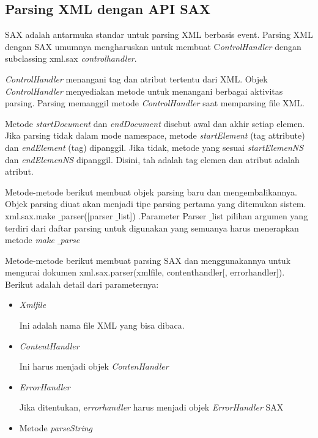 \vspace{10pt}
\subsection{Parsing XML dengan API SAX} 
 
\hspace*{0.5in} SAX adalah antarmuka standar untuk parsing XML berbasis event. Parsing XML dengan SAX umumnya mengharuskan untuk membuat C\textit{ontrolHandler }dengan subclassing xml.sax \textit{controlhandler}. 
 
\hspace*{0.5in} \textit{ControlHandler }menangani tag dan atribut tertentu dari XML. Objek \textit{ControlHandler }menyediakan metode untuk menangani berbagai aktivitas parsing. Parsing memanggil metode \textit{ControlHandler }saat memparsing file XML. 

\hspace*{0.5in} Metode \textit{startDocument} dan \textit{endDocument} disebut awal dan akhir setiap elemen. Jika parsing tidak dalam mode namespace, metode \textit{startElement} (tag attribute) dan \textit{endElement} (tag) dipanggil. Jika tidak, metode yang sesuai \textit{startElemenNS} dan \textit{endElemenNS} dipanggil. Disini, tah adalah tag elemen dan atribut adalah atribut.  
 
\hspace*{0.5in} Metode-metode berikut membuat objek parsing baru dan mengembalikannya. Objek parsing diuat akan menjadi tipe parsing pertama yang ditemukan sistem.  
{\fontsize{10pt}{10pt}\selectfont xml.sax.make $  \_  $parser([parser $  \_  $list])} .Parameter 
Parser $  \_  $list pilihan argumen yang terdiri dari daftar parsing untuk digunakan yang semuanya harus menerapkan metode \textit{make $  \_  $parse} 
 
\hspace*{0.5in} Metode-metode berikut membuat parsing SAX dan menggunakannya untuk mengurai dokumen {\fontsize{10pt}{10pt}\selectfont xml.sax.parser(xmlfile, contenthandler[, errorhandler])}. Berikut adalah detail dari parameternya: 
 
\begin{itemize}
\item \textit{Xmlfile } 

Ini adalah nama file XML yang bisa dibaca. 
\item \textit{ContentHandler } 

Ini harus menjadi objek \textit{ContenHandler} 
\item \textit{ErrorHandler} 

Jika ditentukan, e\textit{rrorhandler} harus menjadi objek \textit{ErrorHandler} SAX 
\item Metode\textit{ parseString}
\end{itemize}

